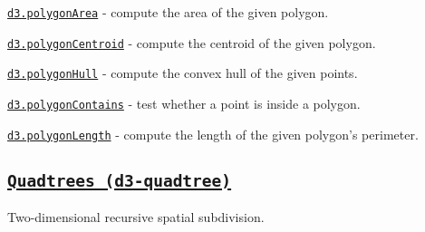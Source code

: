 \begin{DoxyItemize}
\item \href{https://github.com/d3/d3-polygon/blob/master/README.md#polygonArea}{\tt d3.\+polygon\+Area} -\/ compute the area of the given polygon.
\item \href{https://github.com/d3/d3-polygon/blob/master/README.md#polygonCentroid}{\tt d3.\+polygon\+Centroid} -\/ compute the centroid of the given polygon.
\item \href{https://github.com/d3/d3-polygon/blob/master/README.md#polygonHull}{\tt d3.\+polygon\+Hull} -\/ compute the convex hull of the given points.
\item \href{https://github.com/d3/d3-polygon/blob/master/README.md#polygonContains}{\tt d3.\+polygon\+Contains} -\/ test whether a point is inside a polygon.
\item \href{https://github.com/d3/d3-polygon/blob/master/README.md#polygonLength}{\tt d3.\+polygon\+Length} -\/ compute the length of the given polygon’s perimeter.
\end{DoxyItemize}

\subsection*{\href{https://github.com/d3/d3-quadtree}{\tt Quadtrees (d3-\/quadtree)}}

Two-\/dimensional recursive spatial subdivision.


